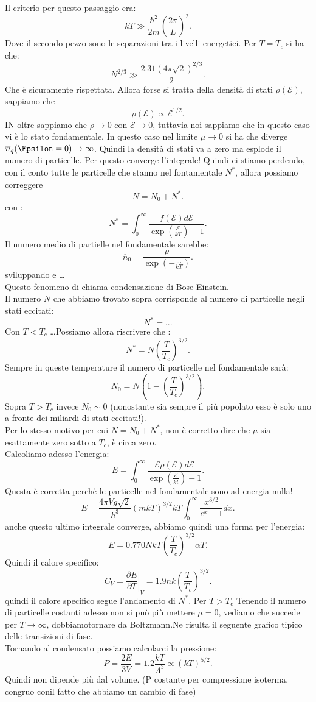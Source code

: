 Il criterio per questo passaggio era:  \[
	kT \gg \frac{\hbar^2}{2m}\left( \frac{2\pi}{L} \right) ^2
.\] Dove il secondo pezzo sono le separazioni tra i livelli energetici.
Per $T = T_{c}$ si ha che:
\[
	N^{2 /3} \gg \frac{2.31 \left( 4\pi\sqrt{2}  \right)^{2 /3}}{2}
.\] 
Che è sicuramente rispettata. Allora forse si tratta della densità di stati $\rho ( \mathcal{E} ) $, sappiamo che 
\[
	\rho ( \mathcal{E} ) \propto \mathcal{E} ^{1 /2}
.\] 
IN oltre sappiamo che $\rho \to 0$ con $\mathcal{E} \to 0$, tuttavia noi sappiamo che in questo caso vi è lo stato fondamentale. In questo caso nel limite $\mu \to 0$ si ha che diverge $\overline{n}_{q}( \Epsilon = 0 ) \to \infty$. Quindi la densità di stati va a zero ma esplode il numero di particelle. Per questo converge l'integrale! Quindi ci stiamo perdendo, con il conto tutte le particelle che stanno nel fontamentale $N^{*}$, allora  possiamo correggere 
\[
	N = N_0 + N^{*}
.\] 
con :
\[
	N^{*} = \int_{0}^{\infty} \frac{f( \mathcal{E} ) d\mathcal{E} }{\exp\left( \frac{\mathcal{E} }{kT} \right) -1} 
.\] 
Il numero medio di partielle nel fondamentale sarebbe:
\[
	\overline{n}_{0} = \frac{\rho }{\exp\left( -\frac{\ldots}{kT} \right) }
.\] sviluppando e \ldots\\
Questo fenomeno di chiama condensazione di Bose-Einstein.\\
Il numero $N$ che abbiamo trovato sopra corrisponde al numero di particelle negli stati eccitati:
\[
	N^{*} =.. 
.\] 
Con $T< T_{c}$ \ldots Possiamo allora riscrivere che :
\[
	N^{*} = N \left( \frac{T}{T_{c}} \right)^{3 /2}
.\] 
Sempre in queste temperature il numero di particelle nel fondamentale sarà:
\[
	N_0 = N\left( 1 -\left( \frac{T}{T_{c}} \right)^{3 /2}
 \right) 
.\] 
Sopra $T>T_{c}$ invece $N_0 \sim 0$ (nonostante sia sempre il più popolato esso è solo uno a fronte dei miliardi di stati eccitati!).\\
Per lo stesso motivo per cui $N = N_0 + N^{*}$, non è corretto dire che $\mu $ sia esattamente zero sotto a $T_{c}$, è circa zero.\\
Calcoliamo adesso l'energia:
\[
	E = \int_{0}^{\infty} \frac{\mathcal{E} \rho ( \mathcal{E} ) d\mathcal{E} }{\exp\left( \frac{\mathcal{E} }{kt} \right) -1} 
.\] 
Questa è corretta perchè le particelle nel fondamentale sono ad energia nulla! 
\[
	E = \frac{4\pi V g \sqrt{2} }{h^3}\left( m k T \right) ^{3 /2} kT \int_{0}^{\infty} \frac{x^{3 /2}}{e^{x}-1}dx  
.\] 
anche questo ultimo integrale converge, abbiamo quindi una forma per l'energia:
\[
	E = 0.770 NkT \left( \frac{T}{T_{c}} \right) ^{3 /2} \alpha T
.\] 
Quindi il calore specifico:
\[
	C_{V}= \left.\frac{\partial E}{\partial T} \right|_{V} = 1.9 nk \left( \frac{T}{T_{c}} \right) ^{3 /2}
.\] 
quindi il calore specifico segue l'andamento di $N^{*}$. 
Per $T > T_{c}$ Tenendo il numero di particelle costanti adesso non si può più mettere $\mu = 0$, vediamo che succede per $T\to \infty$, dobbiamotornare da Boltzmann.Ne risulta il seguente grafico tipico delle transizioni di fase.\\
Tornando al condensato possiamo calcolarci la pressione: 
 \[
	 P = \frac{2E}{3V} = 1.2 \frac{kT}{\Lambda ^3} \propto \left( kT \right) ^{5 /2} 
.\] 
Quindi non dipende più dal volume. (P costante per compressione isoterma, congruo conil fatto che abbiamo un cambio di fase)
